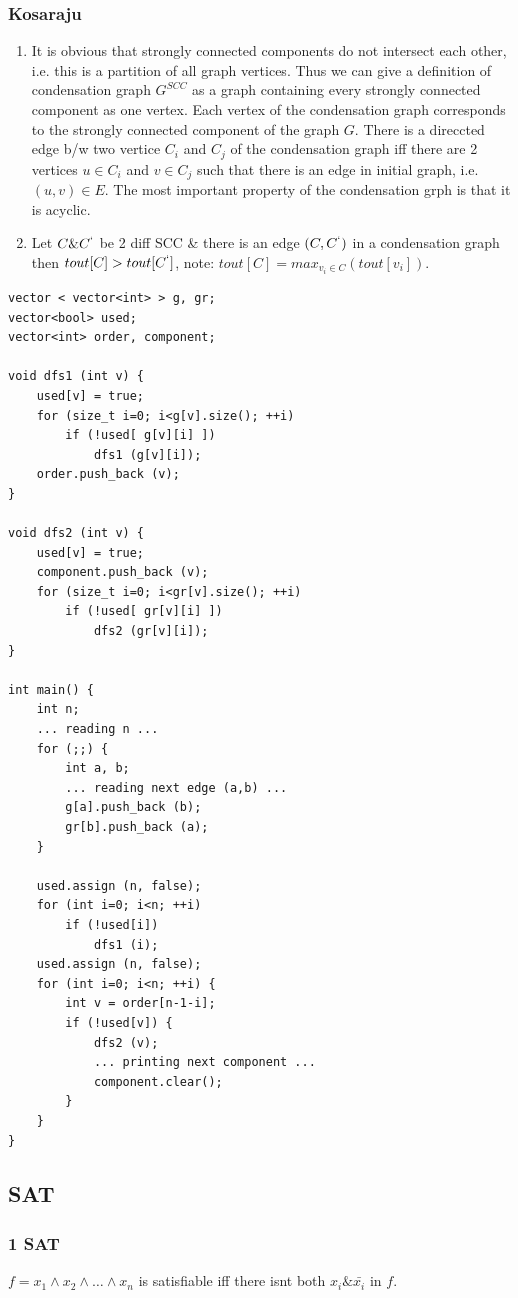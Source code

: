 \documentclass[8pt, a4paper, oneside, twocolumn]{extarticle}
\begin{document}
\subsubsection{Kosaraju}
\begin{enumerate}
    \item It is obvious that strongly connected components do not intersect each other, i.e. this is a partition of all graph vertices. Thus we can give a definition of condensation graph $G^{SCC}$ as a graph containing every strongly connected component as one vertex. Each vertex of the condensation graph corresponds to the strongly connected component of the graph $G$. There is a direccted edge b/w two vertice $C_i$ and $C_j$ of the condensation graph iff there are 2 vertices $u \in C_i$ and $v \in C_j$ such that there is an edge in initial graph, i.e. $(u, v) \in E$. The most important property of the condensation grph is that it is acyclic.
    \item Let $C \& C^`$ be 2 diff SCC \& there is an edge $(C, C^`)$ in a condensation graph then $tout[C] > tout[C^`]$, note: $tout[C] = max_{v_i \in C}(tout[v_i])$.
\end{enumerate}
\begin{verbatim}
vector < vector<int> > g, gr;
vector<bool> used;
vector<int> order, component;

void dfs1 (int v) {
    used[v] = true;
    for (size_t i=0; i<g[v].size(); ++i)
        if (!used[ g[v][i] ])
            dfs1 (g[v][i]);
    order.push_back (v);
}

void dfs2 (int v) {
    used[v] = true;
    component.push_back (v);
    for (size_t i=0; i<gr[v].size(); ++i)
        if (!used[ gr[v][i] ])
            dfs2 (gr[v][i]);
}

int main() {
    int n;
    ... reading n ...
    for (;;) {
        int a, b;
        ... reading next edge (a,b) ...
        g[a].push_back (b);
        gr[b].push_back (a);
    }

    used.assign (n, false);
    for (int i=0; i<n; ++i)
        if (!used[i])
            dfs1 (i);
    used.assign (n, false);
    for (int i=0; i<n; ++i) {
        int v = order[n-1-i];
        if (!used[v]) {
            dfs2 (v);
            ... printing next component ...
            component.clear();
        }
    }
}
\end{verbatim}
\subsection{SAT}
\subsubsection{1 SAT}
$f = x_1 \wedge x_2 \wedge \dots \wedge x_n$ is satisfiable iff there isnt both $x_i \& \bar{x_i}$ in $f$.
\end{document}
